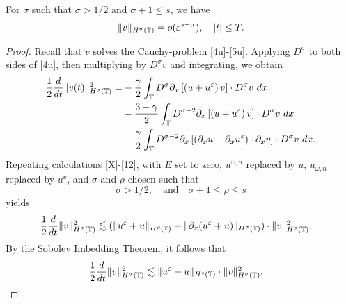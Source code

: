 %
%
\begin{proposition} \label{prop:6r}
For $\sigma$ such that $\sigma > 1/2$ and $\sigma + 1 \le s$, we have
%
%
\begin{equation}
\begin{split}
\|v\|_{H^{\sigma}(\mathbb{T})} = o(\varepsilon^{s- \sigma }), \quad |t| \le T.
\end{split}
\end{equation}
%
%
\end{proposition}
%
%
%
\begin{proof}
Recall that $v$ solves the Cauchy-problem \eqref{4u}-\eqref{5u}.
Applying $D^\sigma$ to both sides of \eqref{4u}, then multiplying by
$D^\sigma v$ and integrating, we obtain 
%
%
\begin{equation*}
\begin{split}
\frac{1}{2}\frac{d}{dt}\|v(t)\|_{H^\sigma(\mathbb{T})}^2
= & - \frac{\gamma}{2}\int_{\mathbb{T}} D^\sigma
\partial_x \left[ \left( u + u^\varepsilon \right)v
\right]\cdot D^\sigma v \ dx
\\
& - \frac{3-\gamma}{2}\int_{\mathbb{T}} D^{\sigma
-2} \partial_x \left[ \left( u + u^\varepsilon
\right)v \right] \cdot D^\sigma v \ dx
\\
& - \frac{\gamma}{2}\int_{\mathbb{T}} D^{\sigma
-2}
\partial_x \left[ \left( \partial_x u + \partial_x u^\varepsilon
\right)\cdot \partial_x v \right] \cdot
D^\sigma v \ dx.
\end{split}
\end{equation*}
%
%
Repeating calculations \eqref{X}-\eqref{12}, with $E$ set to zero,
$u^{\omega,n}$ replaced by $u$, $u_{\omega,n}$ replaced by $u^\ee$, and
$\sigma$ and $\rho$ chosen such that
%
%
%
\begin{equation*}
\label{size_of_sigma}
 \sigma > 1/2,
 \quad 
 \text{and}
 \quad
 \sigma + 1 \le \rho \le s 
\end{equation*}
%
%
yields
%
%
\begin{equation*}
\begin{split}
\frac{1}{2}\frac{d}{dt} \|v\|_{H^\sigma(\mathbb{T})}^2
& \lesssim
(\|u^{\varepsilon} + u\|_{H^{\rho}(\mathbb{T})} +
\|\partial_x(u^{\varepsilon} + u) \|_{H^\sigma(\mathbb{T})})
\cdot \|v\|_{H^\sigma(\mathbb{T})}^2.
\end{split}
\end{equation*}
%
%
By the Sobolev Imbedding Theorem, it follows that 
%
%
\begin{equation}
\begin{split}
\frac{1}{2}\frac{d}{dt} \|v\|_{H^{\sigma}(\ci)}^2
& \lesssim
\|u^{\ee}
+ u\|_{H^{s}(\ci)} \cdot \|v\|_{H^{\sigma}(\ci)}^2.
\label{10x}
\end{split}

\end{equation}
\end{proof}

